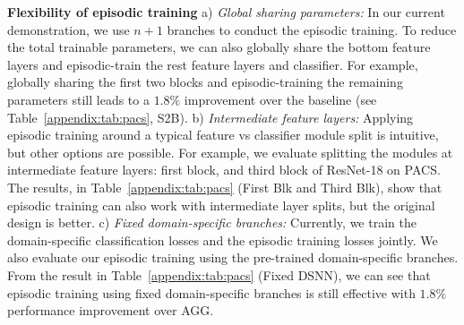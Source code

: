 \documentclass[10pt,twocolumn,letterpaper]{article}
\newcommand{\keypoint}[1]{\vspace{0.1cm}\noindent\textbf{#1}\quad}
\begin{document}
\keypoint{Flexibility of episodic training} a) \emph{Global sharing parameters:} In our current demonstration, we use $n+1$ branches to conduct the episodic training. To reduce the total trainable parameters, we can also globally share the bottom feature layers and episodic-train the rest feature layers and classifier. For example, globally sharing the first two blocks and episodic-training the remaining parameters still leads to a $1.8\%$ improvement over the baseline (see Table~\ref{appendix:tab:pacs}, S2B). b) \emph{Intermediate feature layers:} Applying episodic training around a typical feature vs classifier module split is intuitive, but other options are possible. For example, we evaluate splitting the modules at intermediate feature layers: first block, and third block of ResNet-18 on PACS. The results, in Table~\ref{appendix:tab:pacs} (First Blk and Third Blk), show that episodic training can also work with intermediate layer splits, but the original design is better. c) \emph{Fixed domain-specific branches:} Currently, we train the domain-specific classification losses and the episodic training losses jointly. We also evaluate our episodic training using the pre-trained domain-specific branches. From the result in Table~\ref{appendix:tab:pacs} (Fixed DSNN), we can see that episodic training using fixed domain-specific branches is still effective with $1.8\%$ performance improvement over AGG.
\end{document}
